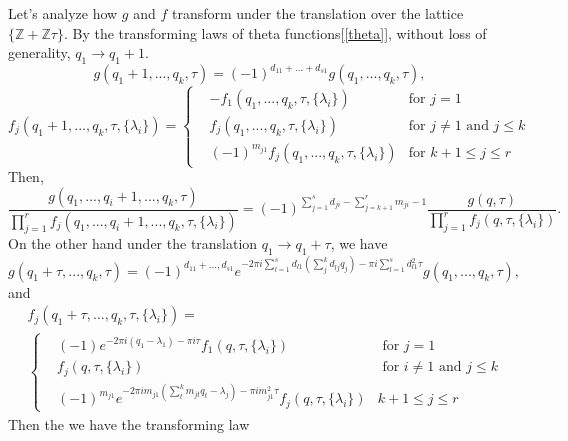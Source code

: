 \documentclass[11pt]{article}
\newcommand{\intg}{\mathbb Z}
\begin{document}
Let's analyze how $g$ and $f$ transform under the translation over the lattice $\{\intg+\intg \tau\}$. By the transforming laws of theta functions[\ref{theta}], without loss of generality, $q_1\rightarrow q_1+1$.
\begin{equation*}
	g(q_1+1,...,q_k,\tau)=(-1)^{d_{11}+...+d_{s1}}g(q_1,...,q_k,\tau),
\end{equation*}
\begin{equation*}
f_j(q_1+1,...,q_k,\tau,\{\lambda_i\})=\left\{
\begin{aligned}
	& - f_1(q_1,...,q_k,\tau,\{\lambda_i\})&\text{for $j=1$}\\
	& f_j(q_1,...,q_k,\tau,\{\lambda_i\})&\text{for $j \neq 1$ and $j\leq k$} \\
	& (-1)^{m_{j1}} f_j (q_1,...,q_k,\tau,\{\lambda_i\})&\text{for $k+1\leq j\leq r$}
\end{aligned}
\right.
\end{equation*}
Then,
\begin{equation*}
\frac{g(q_1,...,q_i+1,...,q_k,\tau)}{\prod_{j=1}^r f_j (q_1,...,q_i+1,...,q_k,\tau,\{\lambda_i\})}=(-1)^{\sum_{j=1}^s d_{ji}-\sum_{j=k+1}^r m_{ji}-1}\frac{g(q,\tau)}{\prod_{j=1}^r f_j (q,\tau,\{\lambda_i\})}.
\end{equation*}
On the other hand under the translation $q_1\rightarrow q_1+\tau$, we have
\begin{equation*}
g(q_1+\tau,...,q_k,\tau)
=(-1)^{d_{11}+...,d_{s1}} e^{-2\pi i\sum_{l=1}^s d_{l1}(\sum^k_j d_{lj}q_j)-\pi i\sum_{l=1}^s d^2_{l1}\tau} g(q_1,...,q_k,\tau),
\end{equation*}
and
\begin{equation*}
\begin{aligned}
&f_j(q_1+\tau,...,q_k,\tau,\{\lambda_i\})=\\
&\left\{
\begin{aligned}
&(-1)e^{-2\pi i (q_1-\lambda_1)-\pi i \tau} f_1(q,\tau,\{\lambda_i\}) &\text{ for $j=1$ }\\
&f_j(q,\tau,\{\lambda_i\}) &\text{ for $i\neq 1$ and $j\leq k$}\\
& (-1)^{m_{j1}} e^{-2\pi i m_{j1}(\sum^k_t m_{jt}q_t-\lambda_j)-\pi i m_{j1}^2 \tau}f_j(q,\tau,\{\lambda_i\})&\text{$k+1 \leq j\leq r$}
\end{aligned}
\right.
\end{aligned}
\end{equation*}
Then the we have the transforming law
\end{document}
